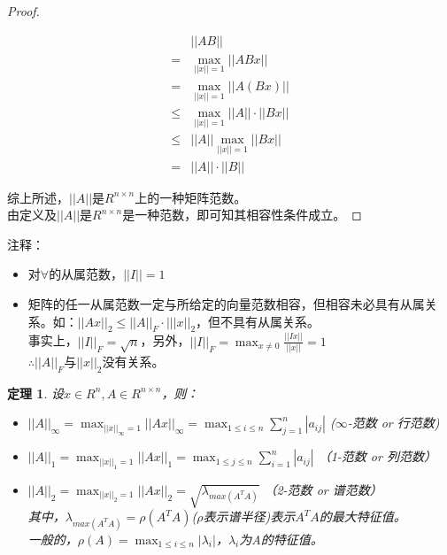 \documentclass[a4paper]{article}
\newtheorem{theorem}{定理}[section]
\begin{document}
\begin{proof}
\begin{itemize}
\begin{itemize}
\begin{equation*}
\begin{split}
&||AB||\\
=& \max_{||x||=1}||ABx||\\
=&\max_{||x||=1}||A(Bx)|| \\
\le&\max_{||x||=1}||A||\cdot||Bx||\\
\le& ||A||\max_{||x||=1}||Bx|| \\
=& ||A||\cdot ||B||
\end{split}
\end{equation*}
\end{itemize}
\end{itemize}
综上所述，$||A||$是$R^{n\times n}$上的一种矩阵范数。\\
由定义及$||A||$是$R^{n\times n}$是一种范数，即可知其相容性条件成立。
\end{proof}

注释：
\begin{itemize}
\item 对$\forall $的从属范数，$||I|| = 1$
\item 矩阵的任一从属范数一定与所给定的向量范数相容，但相容未必具有从属关系。如：$||Ax||_2 \le ||A||_F\cdot |||x||_2$，但不具有从属关系。\\
事实上，$||I||_F = \sqrt{n}$，另外，$||I||_F=\max_{x \neq 0 }\frac{||Ix||}{||x||} = 1$ \\
$\therefore$$||A||_F$与$||x||_2$没有关系。
\end{itemize}

\begin{theorem}
设$x \in R^n, A \in R^{n\times n}$，则：
\begin{itemize}
\item $||A||_\infty = \max_{||x||_\infty = 1}||Ax||_\infty = \max_{1\le i \le n}\sum_{j=1}^{n}|a_{ij}|$ \hfill ($\infty$-范数 or 行范数)
\item $||A||_1 = \max_{||x||_1=1}||Ax||_1=\max_{1 \le j \le n}\sum^n_{i=1}|a_{ij}|$ \hfill （1-范数 or 列范数）
\item $||A||_2=\max_{||x||_2 = 1}||Ax||_2=\sqrt{\lambda_{max(A^TA)}}$ \hfill （2-范数 or 谱范数）\\
其中，$\lambda_{max(A^TA)}=\rho(A^TA)$($\rho$表示谱半径)表示$A^TA$的最大特征值。\\
一般的，$\rho(A)=\max_{1 \le i \le n}|\lambda_i|$，$\lambda_i$为A的特征值。
\end{itemize}
\end{theorem}
\end{document}
